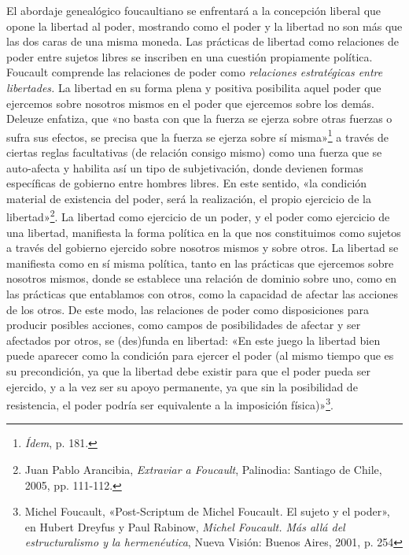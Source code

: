 El abordaje genealógico foucaultiano se enfrentará a la concepción liberal que opone la libertad al poder, mostrando como el poder y la libertad no son más que las dos caras de una misma moneda. Las prácticas de libertad como relaciones de poder entre sujetos libres se inscriben en una cuestión propiamente política. Foucault comprende las relaciones de poder como \emph{relaciones estratégicas entre libertades.} La libertad en su forma plena y positiva posibilita aquel poder que ejercemos sobre nosotros mismos en el poder que ejercemos sobre los demás. Deleuze enfatiza, que «no basta con que la fuerza se ejerza sobre otras fuerzas o sufra sus efectos, se precisa que la fuerza se ejerza sobre sí misma»\footnote{\emph{Ídem}, p. 181.} a través de ciertas reglas facultativas (de relación consigo mismo) como una fuerza que se auto-afecta y habilita así un tipo de subjetivación, donde devienen formas específicas de gobierno entre hombres libres. En este sentido, «la condición material de existencia del poder, será la realización, el propio ejercicio de la libertad»\footnote{Juan Pablo Arancibia, \emph{Extraviar a Foucault}, Palinodia: Santiago de Chile, 2005, pp. 111-112.}. La libertad como ejercicio de un poder, y el poder como ejercicio de una libertad, manifiesta la forma política en la que nos constituimos como sujetos a través del gobierno ejercido sobre nosotros mismos y sobre otros. La libertad se manifiesta como en sí misma política, tanto en las prácticas que ejercemos sobre nosotros mismos, donde se establece una relación de dominio sobre uno, como en las prácticas que entablamos con otros, como la capacidad de afectar las acciones de los otros. De este modo, las relaciones de poder como disposiciones para producir posibles acciones, como campos de posibilidades de afectar y ser afectados por otros, se (des)funda en libertad: «En este juego la libertad bien puede aparecer como la condición para ejercer el poder (al mismo tiempo que es su precondición, ya que la libertad debe existir para que el poder pueda ser ejercido, y a la vez ser su apoyo permanente, ya que sin la posibilidad de resistencia, el poder podría ser equivalente a la imposición física)»\footnote{Michel Foucault, «Post-Scriptum de Michel Foucault. El sujeto y el poder», en Hubert Dreyfus y Paul Rabinow, \emph{Michel Foucault. Más allá del estructuralismo y la hermenéutica}, Nueva Visión: Buenos Aires, 2001, p. 254}.

